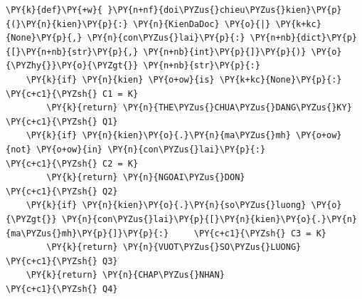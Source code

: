 \begin{Verbatim}[commandchars=\\\{\},frame=single,framerule=0.3pt,rulecolor=\color{black!40},fontsize=\footnotesize,breaklines=true]
\PY{k}{def}\PY{+w}{ }\PY{n+nf}{doi\PYZus{}chieu\PYZus{}kien}\PY{p}{(}\PY{n}{kien}\PY{p}{:} \PY{n}{KienDaDoc} \PY{o}{|} \PY{k+kc}{None}\PY{p}{,} \PY{n}{con\PYZus{}lai}\PY{p}{:} \PY{n+nb}{dict}\PY{p}{[}\PY{n+nb}{str}\PY{p}{,} \PY{n+nb}{int}\PY{p}{]}\PY{p}{)} \PY{o}{\PYZhy{}}\PY{o}{\PYZgt{}} \PY{n+nb}{str}\PY{p}{:}
    \PY{k}{if} \PY{n}{kien} \PY{o+ow}{is} \PY{k+kc}{None}\PY{p}{:}                            \PY{c+c1}{\PYZsh{} C1 = K}
        \PY{k}{return} \PY{n}{THE\PYZus{}CHUA\PYZus{}DANG\PYZus{}KY}                 \PY{c+c1}{\PYZsh{} Q1}
    \PY{k}{if} \PY{n}{kien}\PY{o}{.}\PY{n}{ma\PYZus{}mh} \PY{o+ow}{not} \PY{o+ow}{in} \PY{n}{con\PYZus{}lai}\PY{p}{:}               \PY{c+c1}{\PYZsh{} C2 = K}
        \PY{k}{return} \PY{n}{NGOAI\PYZus{}DON}                        \PY{c+c1}{\PYZsh{} Q2}
    \PY{k}{if} \PY{n}{kien}\PY{o}{.}\PY{n}{so\PYZus{}luong} \PY{o}{\PYZgt{}} \PY{n}{con\PYZus{}lai}\PY{p}{[}\PY{n}{kien}\PY{o}{.}\PY{n}{ma\PYZus{}mh}\PY{p}{]}\PY{p}{:}     \PY{c+c1}{\PYZsh{} C3 = K}
        \PY{k}{return} \PY{n}{VUOT\PYZus{}SO\PYZus{}LUONG}                    \PY{c+c1}{\PYZsh{} Q3}
    \PY{k}{return} \PY{n}{CHAP\PYZus{}NHAN}                            \PY{c+c1}{\PYZsh{} Q4}
\end{Verbatim}
